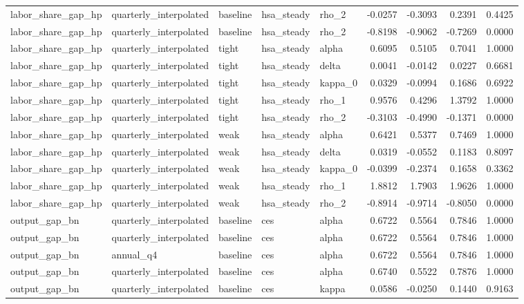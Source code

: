 \begin{tabular}{lllllrrrr}
labor\_share\_gap\_hp & quarterly\_interpolated & baseline & hsa\_steady & rho\_2 & -0.0257 & -0.3093 & 0.2391 & 0.4425 \\
labor\_share\_gap\_hp & quarterly\_interpolated & baseline & hsa\_steady & rho\_2 & -0.8198 & -0.9062 & -0.7269 & 0.0000 \\
labor\_share\_gap\_hp & quarterly\_interpolated & tight & hsa\_steady & alpha & 0.6095 & 0.5105 & 0.7041 & 1.0000 \\
labor\_share\_gap\_hp & quarterly\_interpolated & tight & hsa\_steady & delta & 0.0041 & -0.0142 & 0.0227 & 0.6681 \\
labor\_share\_gap\_hp & quarterly\_interpolated & tight & hsa\_steady & kappa\_0 & 0.0329 & -0.0994 & 0.1686 & 0.6922 \\
labor\_share\_gap\_hp & quarterly\_interpolated & tight & hsa\_steady & rho\_1 & 0.9576 & 0.4296 & 1.3792 & 1.0000 \\
labor\_share\_gap\_hp & quarterly\_interpolated & tight & hsa\_steady & rho\_2 & -0.3103 & -0.4990 & -0.1371 & 0.0000 \\
labor\_share\_gap\_hp & quarterly\_interpolated & weak & hsa\_steady & alpha & 0.6421 & 0.5377 & 0.7469 & 1.0000 \\
labor\_share\_gap\_hp & quarterly\_interpolated & weak & hsa\_steady & delta & 0.0319 & -0.0552 & 0.1183 & 0.8097 \\
labor\_share\_gap\_hp & quarterly\_interpolated & weak & hsa\_steady & kappa\_0 & -0.0399 & -0.2374 & 0.1658 & 0.3362 \\
labor\_share\_gap\_hp & quarterly\_interpolated & weak & hsa\_steady & rho\_1 & 1.8812 & 1.7903 & 1.9626 & 1.0000 \\
labor\_share\_gap\_hp & quarterly\_interpolated & weak & hsa\_steady & rho\_2 & -0.8914 & -0.9714 & -0.8050 & 0.0000 \\
output\_gap\_bn & quarterly\_interpolated & baseline & ces & alpha & 0.6722 & 0.5564 & 0.7846 & 1.0000 \\
output\_gap\_bn & quarterly\_interpolated & baseline & ces & alpha & 0.6722 & 0.5564 & 0.7846 & 1.0000 \\
output\_gap\_bn & annual\_q4 & baseline & ces & alpha & 0.6722 & 0.5564 & 0.7846 & 1.0000 \\
output\_gap\_bn & quarterly\_interpolated & baseline & ces & alpha & 0.6740 & 0.5522 & 0.7876 & 1.0000 \\
output\_gap\_bn & quarterly\_interpolated & baseline & ces & kappa & 0.0586 & -0.0250 & 0.1440 & 0.9163 \\

\end{tabular}
